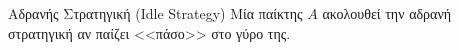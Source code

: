 {}
\begin{definitiongr}{Αδρανής Στρατηγική \textlatin{(Idle Strategy)}}
  Μία παί\-κτης $A$ ακολουθεί την αδρανή στρατηγική αν παίζει <<πάσο>> στο γύρο της.
\end{definitiongr}
